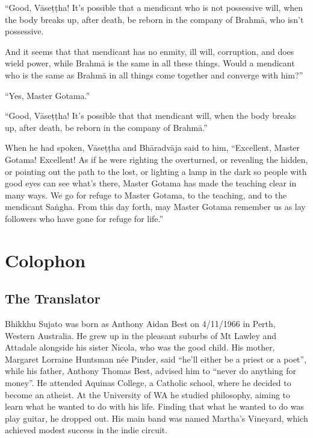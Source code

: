 \documentclass[12pt,openany]{book}%
\let\oldbackmatter\backmatter
\renewcommand{\backmatter}{%
\chapterfont{\setstretch{.85}\normalfont\centering}%
\sectionfont{\setstretch{.85}\Semiboldsubheadfont}%
\oldbackmatter}
\begin{document}
“Good, \textsanskrit{Vāseṭṭha}! It’s possible that a mendicant who is not possessive will, when the body breaks up, after death, be reborn in the company of \textsanskrit{Brahmā}, who isn’t possessive. 

And it seems that that mendicant has no enmity, ill will, corruption, and does wield power, while \textsanskrit{Brahmā} is the same in all these things. Would a mendicant who is the same as \textsanskrit{Brahmā} in all things come together and converge with him?” 

“Yes, Master Gotama.” 

“Good, \textsanskrit{Vāseṭṭha}! It’s possible that that mendicant will, when the body breaks up, after death, be reborn in the company of \textsanskrit{Brahmā}.” 

When he had spoken, \textsanskrit{Vāseṭṭha} and \textsanskrit{Bhāradvāja} said to him, “Excellent, Master Gotama! Excellent! As if he were righting the overturned, or revealing the hidden, or pointing out the path to the lost, or lighting a lamp in the dark so people with good eyes can see what’s there, Master Gotama has made the teaching clear in many ways. We go for refuge to Master Gotama, to the teaching, and to the mendicant \textsanskrit{Saṅgha}. From this day forth, may Master Gotama remember us as lay followers who have gone for refuge for life.” 

%
\backmatter%
\chapter*{Colophon}

\section*{The Translator}

Bhikkhu Sujato was born as Anthony Aidan Best on 4/11/1966 in Perth, Western Australia. He grew up in the pleasant suburbs of Mt Lawley and Attadale alongside his sister Nicola, who was the good child. His mother, Margaret Lorraine Huntsman née Pinder, said “he’ll either be a priest or a poet”, while his father, Anthony Thomas Best, advised him to “never do anything for money”. He attended Aquinas College, a Catholic school, where he decided to become an atheist. At the University of WA he studied philosophy, aiming to learn what he wanted to do with his life. Finding that what he wanted to do was play guitar, he dropped out. His main band was named Martha’s Vineyard, which achieved modest success in the indie circuit. 
\end{document}
